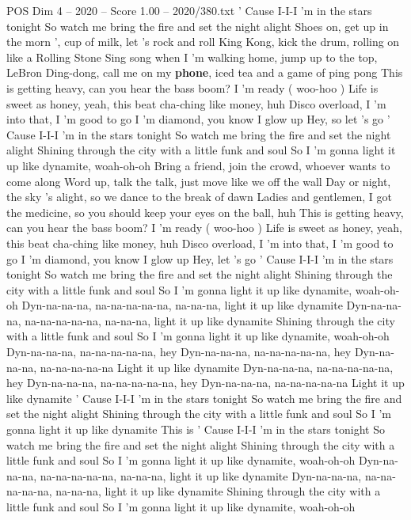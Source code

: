 \begin{textsample}{POS Dim 4 – 2020 – Score 1.00 – 2020/380.txt}  \label{ex:f4_pos_030}
' Cause I-I-I 'm in the stars tonight So watch me bring the fire and set the night alight Shoes on, get up in the morn ', cup of milk, let 's rock and roll King Kong, kick the drum, rolling on like a Rolling Stone Sing song when I 'm walking home, jump up to the top, LeBron Ding-dong, call me on my \textbf{phone}, iced tea and a game of ping pong This is getting heavy, can you hear the bass boom?
I 'm ready ( woo-hoo ) Life is sweet as honey, yeah, this beat cha-ching like money, huh Disco overload, I 'm into that, I 'm good to go I 'm diamond, you know I glow up Hey, so let 's go ' Cause I-I-I 'm in the stars tonight So watch me bring the fire and set the night alight Shining through the city with a little funk and soul So I 'm gonna light it up like dynamite, woah-oh-oh Bring a friend, join the crowd, whoever wants to come along Word up, talk the talk, just move like we off the wall Day or night, the sky 's alight, so we dance to the break of dawn Ladies and gentlemen, I got the medicine, so you should keep your eyes on the ball, huh This is getting heavy, can you hear the bass boom?
I 'm ready ( woo-hoo ) Life is sweet as honey, yeah, this beat cha-ching like money, huh Disco overload, I 'm into that, I 'm good to go I 'm diamond, you know I glow up Hey, let 's go ' Cause I-I-I 'm in the stars tonight So watch me bring the fire and set the night alight Shining through the city with a little funk and soul So I 'm gonna light it up like dynamite, woah-oh-oh Dyn-na-na-na, na-na-na-na-na, na-na-na, light it up like dynamite Dyn-na-na-na, na-na-na-na-na, na-na-na, light it up like dynamite Shining through the city with a little funk and soul So I 'm gonna light it up like dynamite, woah-oh-oh Dyn-na-na-na, na-na-na-na-na, hey Dyn-na-na-na, na-na-na-na-na, hey Dyn-na-na-na, na-na-na-na-na Light it up like dynamite Dyn-na-na-na, na-na-na-na-na, hey Dyn-na-na-na, na-na-na-na-na, hey Dyn-na-na-na, na-na-na-na-na Light it up like dynamite ' Cause I-I-I 'm in the stars tonight So watch me bring the fire and set the night alight Shining through the city with a little funk and soul So I 'm gonna light it up like dynamite This is ' Cause I-I-I 'm in the stars tonight So watch me bring the fire and set the night alight Shining through the city with a little funk and soul So I 'm gonna light it up like dynamite, woah-oh-oh Dyn-na-na-na, na-na-na-na-na, na-na-na, light it up like dynamite Dyn-na-na-na, na-na-na-na-na, na-na-na, light it up like dynamite Shining through the city with a little funk and soul So I 'm gonna light it up like dynamite, woah-oh-oh

\end{textsample}
